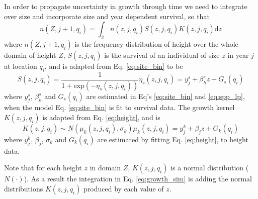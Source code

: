 \documentclass[12pt,a4paper]{article}
\begin{document}
In order to propagate uncertainty in growth through time we need to integrate over size and incorporate size and year dependent survival, so that
\begin{equation}\label{eq:growth_sim}
	n(Z, j + 1, q_i) = \int_Z n(z, j, q_i)S(z, j, q_i)K(z, j, q_i)\text{d}z 
\end{equation}        
where $n(Z, j + 1, q_i)$ is the frequency distribution of height over the whole domain of height $Z$, $S(z, j, q_i)$ is the survival of an individual of size $z$ in year $j$ at location $q_i$, and is adapted from Eq. \ref{eq:site_bin} to be 
\begin{subequations}
\label{eq:survival}
\begin{equation}
	S(z, j, q_i) = \frac{1}{1 + \text{exp}(-\eta_s(z, j, q_i))}
\end{equation}
\begin{equation}
	\eta_s(z, j, q_i) = y_j^s + \beta_h^s z + G_s(q_i)
\end{equation}
\end{subequations}
where $y_j^s$, $\beta_h^s$ and $G_s(q_i)$ are estimated in Eq's \ref{eq:site_bin} and \ref{eq:spp_lp}, when the model Eq. \ref{eq:site_bin} is fit to survival data. The growth kernel $K(z, j, q_i)$ is adapted from Eq. \ref{eq:height}, and is 
\begin{subequations}
\label{eq:growth}
\begin{equation}
	K(z, j, q_i) \sim N(\mu_k(z, j, q_i), \sigma_k)
\end{equation}
\begin{equation}
	\mu_k(z, j, q_i) = y_j^k + \beta_j z + G_k(q_i)
\end{equation}
\end{subequations}
where $y_j^k$, $\beta_j$, $\sigma_k$ and $G_k(q_i)$ are estimated by fitting Eq. \ref{eq:height}, to height data. 

Note that for each height $z$ in domain $Z$, $K(z, j, q_i)$ is a normal distribution ($N(\cdot)$). As a result the integration in Eq. \ref{eq:growth_sim} is adding the normal distributions $K(z, j, q_i)$ produced by each value of $z$. 
\end{document}

